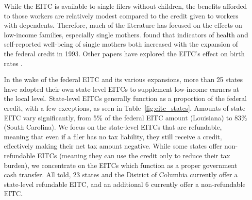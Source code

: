 \documentclass{article}
\begin{document}
While the EITC is available to single filers without children, the benefits afforded to those workers are relatively modest compared to the credit given to workers with dependents. Therefore, much of the literature has focused on the effects on low-income families, especially single mothers. \cite{ evans2014giving} found that indicators of health and self-reported well-being of single mothers both increased with the expansion of the federal credit in 1993. Other papers have explored the EITC’s effect on birth rates \citep{baughman2003did}.

In the wake of the federal EITC and its various expansions, more than 25 states have adopted their own state-level EITCs to supplement low-income earners at the local level. State-level EITCs generally function as a proportion of the federal credit, with a few exceptions, as seen in Table~\ref{fig:eitc_states}. Amounts of state EITC vary significantly, from 5\% of the federal EITC amount (Louisiana) to 83\% (South Carolina). We focus on the state-level EITCs that are refundable, meaning that even if a filer has no tax liability, they still receive a credit, effectively making their net tax amount negative. While some states offer non-refundable EITCs (meaning they can use the credit only to reduce their tax burden), we concentrate on the EITCs which function as a proper government cash transfer. All told, 23 states and the District of Columbia currently offer a state-level refundable EITC, and an additional 6 currently offer a non-refundable EITC.
\end{document}
